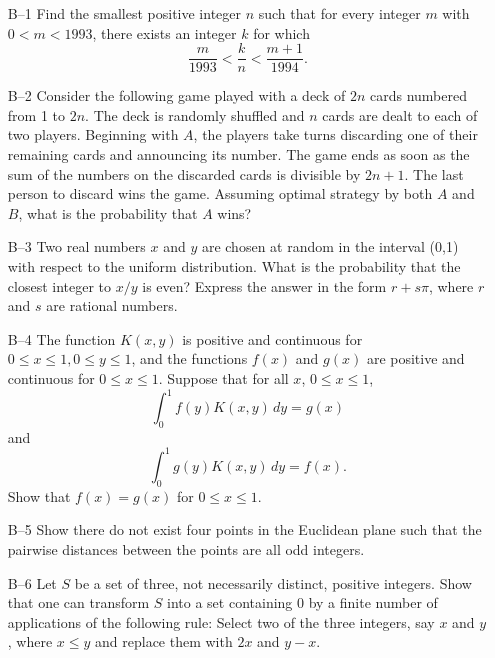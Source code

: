 \documentclass[amssymb,twocolumn,pra,10pt,aps]{revtex4-1}
\begin{document}
\begin{itemize}
\item[B--1]
Find the smallest positive integer $n$ such that for every integer $m$
with $0 < m < 1993$, there exists an integer $k$ for which
\[
\frac{m}{1993} < \frac{k}{n} < \frac{m+1}{1994}.
\]

\item[B--2]
Consider the following game played with a deck of $2n$ cards numbered
from 1 to $2n$. The deck is randomly shuffled and $n$ cards are dealt to
each of two players. Beginning with $A$, the players take turns
discarding one of their remaining cards and announcing its number. The
game ends as soon as the sum of the numbers on the discarded cards is
divisible by $2n+1$. The last person to discard wins the game. Assuming
optimal strategy by both $A$ and $B$, what is the probability that $A$ wins?

\item[B--3]
Two real numbers $x$ and $y$ are chosen at random in the interval (0,1)
with respect to the uniform distribution. What is the probability that
the closest integer to $x/y$ is even? Express the answer in the form
$r+s\pi$, where $r$ and $s$ are rational numbers.

\item[B--4]
The function $K(x,y)$ is positive and continuous for $0 \leq x \leq 1, 0
\leq y \leq 1$, and the functions $f(x)$ and $g(x)$ are positive and
continuous for $0 \leq x \leq 1$. Suppose that for all $x$, $0 \leq x \leq 1$,
\[
\int_0^1 f(y)K(x,y)\,dy = g(x)
\]
and
\[
\int_0^1 g(y)K(x,y)\,dy = f(x).
\]
Show that $f(x) = g(x)$ for $0 \leq x \leq 1$.

\item[B--5]
Show there do not exist four points in the Euclidean plane such that the
pairwise distances between the points are all odd integers.

\item[B--6]
Let $S$ be a set of three, not necessarily distinct, positive integers.
Show that one can transform $S$ into a set containing 0 by a finite
number of applications of the following rule: Select two of the three
integers, say $x$ and $y$, where $x \leq y$ and replace them with $2x$ and $y-x$.

\end{itemize}
\end{document}
